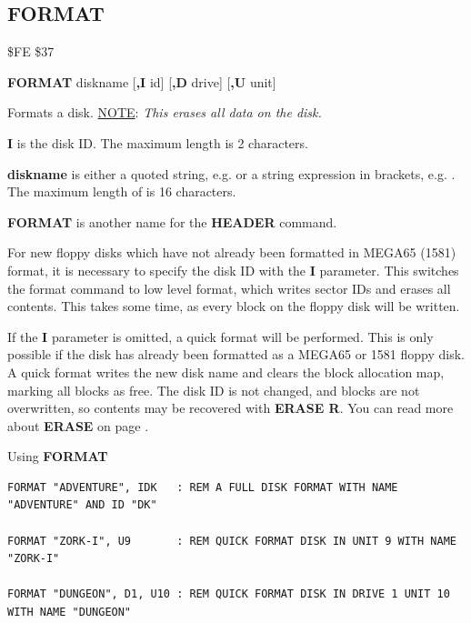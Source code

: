 \subsection{FORMAT}
\begin{description}[leftmargin=2cm,style=nextline]
\item [Token:]    \$FE \$37

\item [Format:]   {\bf FORMAT} diskname [{\bf,I} id] [{\bf,D} drive] [{\bf,U} unit]

\item [Usage:]    Formats a disk. \underline{NOTE}: {\em This erases all data on the disk.}

                  {\bf I} is the disk ID. The maximum length is 2 characters.

                  {\bf diskname} is either a quoted string, e.g.  or a string expression in brackets, e.g. . The maximum length of is 16 characters.

                  \drivedefinition

                  \unitdefinition

\item [Remarks:]  {\bf FORMAT} is another name for the {\bf HEADER} command.

                  For new floppy disks which have not already been formatted in MEGA65 (1581) format, it is necessary to specify the disk ID with the {\bf I} parameter. This switches the format command to low level format, which writes sector IDs and erases all contents. This takes some time, as every block on the floppy disk will be written.

                  If the {\bf I} parameter is omitted, a quick format will be performed. This is only possible if the disk has already been formatted as a MEGA65 or 1581 floppy disk. A quick format writes the new disk name and clears the block allocation map, marking all blocks as free. The disk ID is not changed, and blocks are not overwritten, so contents may be recovered with {\bf ERASE R}. You can read more about {\bf ERASE} on page \pageref{BASIC 65 Commands!ERASE}.

\item [Examples:] Using {\bf FORMAT}

\begin{tcolorbox}[colback=black,coltext=white]
\verbatimfont{\codefont}
\begin{verbatim}
FORMAT "ADVENTURE", IDK   : REM A FULL DISK FORMAT WITH NAME "ADVENTURE" AND ID "DK"

FORMAT "ZORK-I", U9       : REM QUICK FORMAT DISK IN UNIT 9 WITH NAME "ZORK-I"

FORMAT "DUNGEON", D1, U10 : REM QUICK FORMAT DISK IN DRIVE 1 UNIT 10 WITH NAME "DUNGEON"
\end{verbatim}
\end{tcolorbox}
\end{description}

